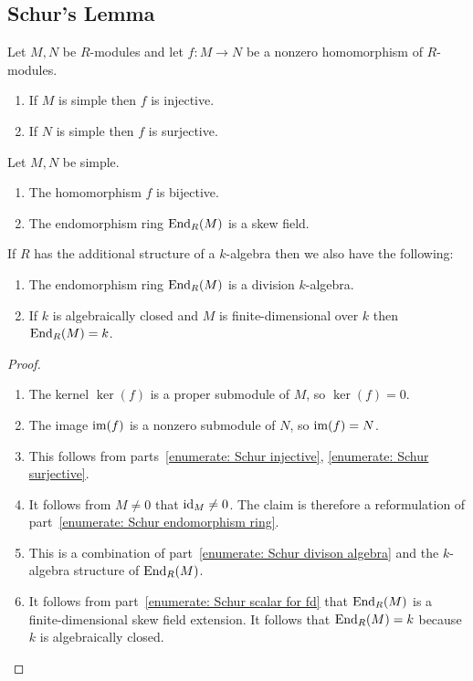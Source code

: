 \subsection{Schur’s Lemma}


\begin{proposition}
  \label{proposition: schurs lemma for modules}
  Let $M, N$ be $R$-modules and let $f \colon M \to N$ be a nonzero homomorphism of $R$-modules.
  \begin{enumerate}
    \item
      \label{enumerate: Schur injective}
      If $M$ is simple then $f$ is injective.
    \item
      \label{enumerate: Schur surjective}
      If $N$ is simple then $f$ is surjective.
  \end{enumerate}
  Let $M, N$ be simple.
  \begin{enumerate}[resume]
    \item
      \label{enumerate: Schur bijective}
      The homomorphism $f$ is bijective.
    \item
      \label{enumerate: Schur endomorphism ring}
      The endomorphism ring $\operatorname{End}_R(M)$ is a skew field.
  \end{enumerate}
  If $R$ has the additional structure of a $k$-algebra then we also have the following:
  \begin{enumerate}[resume]
    \item
      \label{enumerate: Schur divison algebra}
      The endomorphism ring $\operatorname{End}_R(M)$ is a division $k$-algebra.
    \item
      \label{enumerate: Schur scalar for fd}
      If $k$ is algebraically closed and $M$ is finite-dimensional over $k$ then $\operatorname{End}_R(M) = k$.
  \end{enumerate}
\end{proposition}


\begin{proof}
  \leavevmode
  \begin{enumerate}
    \item
      The kernel $\ker(f)$ is a proper submodule of $M$, so $\ker(f) = 0$.
    \item
      The image $\operatorname{im}(f)$ is a nonzero submodule of $N$, so $\operatorname{im}(f) = N$.
    \item
      This follows from parts~\ref*{enumerate: Schur injective}, \ref*{enumerate: Schur surjective}.
    \item
      It follows from $M \neq 0$ that $\operatorname{id}_M \neq 0$.
      The claim is therefore a reformulation of part~\ref*{enumerate: Schur endomorphism ring}.
    \item
      This is a combination of part~\ref*{enumerate: Schur divison algebra} and the $k$-algebra structure of $\operatorname{End}_R(M)$.
    \item
      It follows from part~\ref*{enumerate: Schur scalar for fd} that $\operatorname{End}_R(M)$ is a finite-dimensional skew field extension.
      It follows that $\operatorname{End}_R(M) = k$ because $k$ is algebraically closed.
    \qedhere
  \end{enumerate}
\end{proof}



